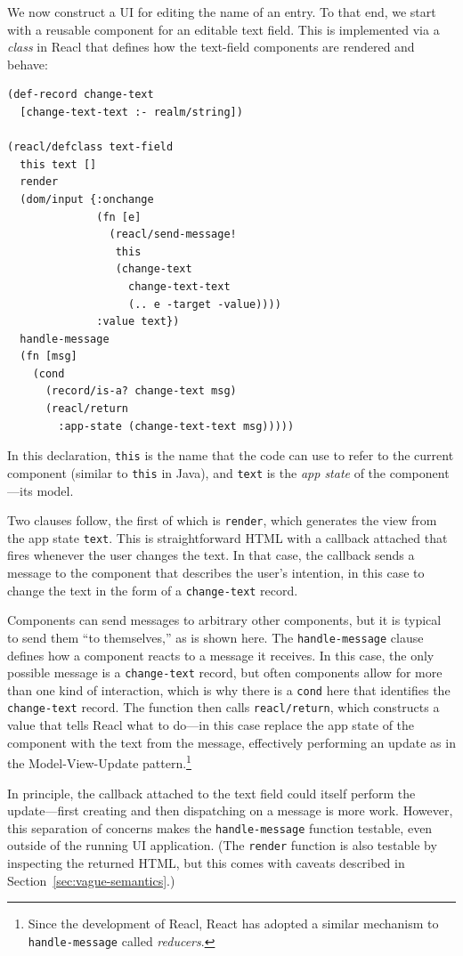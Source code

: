 \documentclass[sigplan,review,screen]{acmart}
\begin{document}
We now construct a UI for editing the name of an entry.  To that end,
we start with a reusable component for an editable text field.  This
is implemented via a \textit{class} in Reacl that defines how the
text-field components are rendered and behave:
%
\begin{verbatim}
(def-record change-text
  [change-text-text :- realm/string])

(reacl/defclass text-field
  this text []
  render
  (dom/input {:onchange 
              (fn [e]
                (reacl/send-message!
                 this
                 (change-text
                   change-text-text
                   (.. e -target -value))))
              :value text})
  handle-message
  (fn [msg]
    (cond
      (record/is-a? change-text msg)
      (reacl/return
        :app-state (change-text-text msg)))))
\end{verbatim}
%
In this declaration, \texttt{this} is the name that the code can use
to refer to the current component (similar to \texttt{this} in Java),
and \texttt{text} is the \textit{app state} of the component---its
model.

Two clauses follow, the first of which is \texttt{render}, which
generates the view from the app state \texttt{text}.  This is
straightforward HTML with a callback attached that fires whenever the
user changes the text.  In that case, the callback sends a
message to the component that describes the user's intention,
in this case to change the text in the form of a \texttt{change-text}
record.

Components can send messages to arbitrary other components, but it is
typical to send them ``to themselves,'' as is shown here.  The
\texttt{handle-message} clause defines how a component reacts to a
message it receives.  In this case, the only possible message is a
\texttt{change-text} record, but often components allow for more than
one kind of interaction, which is why there is a \texttt{cond} here that
identifies the \texttt{change-text} record.  The function then calls
\texttt{reacl/return}, which constructs a value that tells Reacl what
to do---in this case replace the app state of the component with the
text from the message, effectively performing an update as in the
Model-View-Update pattern.\footnote{Since the development of Reacl,
  React has adopted a similar mechanism to \texttt{handle-message}
  called \textit{reducers}.}

In principle, the callback attached to the text field could itself
perform the update---first creating and then dispatching on a message
is more work.  However, this separation of concerns makes the
\texttt{handle-message} function testable, even outside of the running
UI application.  (The \texttt{render} function is also testable by
inspecting the returned HTML, but this comes with caveats described in
Section~\ref{sec:vague-semantics}.)
\end{document}
